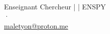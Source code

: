 \begin{titlepage}
\vspace{0.6cm}

\begin{center}
    {\large\bfseries\color{CouleurPrimaire}
        \auteurcours}\\[0.5ex]
    {\normalsize\color{CouleurSecondaire}
       Enseignant Chercheur | \laboratoire{} | ENSPY}\\[0.2ex]
    {\small\color{CouleurBordInfo}
        \institutionprimaire{} · \tutelle}\\[0.2ex]
    {\small\color{CouleurBordInfo}
        \href{mailto:maletyon@proton.me}{maletyon@proton.me}}
\end{center}

\end{titlepage}
